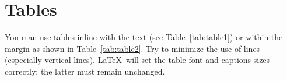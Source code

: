 \section{Tables}
You man use tables inline with the text (see Table~\ref{tab:table1})
or within the margin as shown in Table~\ref{tab:table2}. Try to
minimize the use of lines (especially vertical lines). \LaTeX\ will
set the table font and captions sizes correctly; the latter must
remain unchanged.
